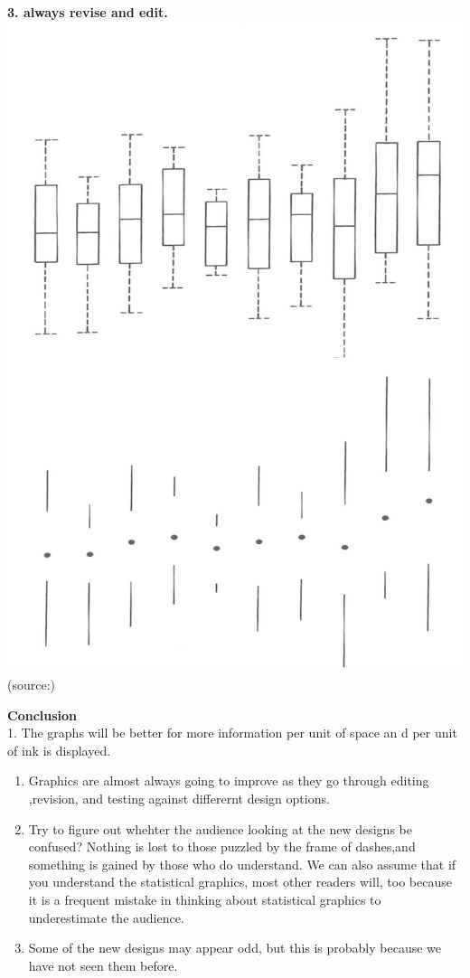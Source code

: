 \documentclass[]{book}
\theoremstyle{definition}
\theoremstyle{definition}
\theoremstyle{definition}
\theoremstyle{remark}
\begin{document}
\textbf{3. always revise and edit.}\\
\includegraphics{images/Tufte_figure4.png} (source:\citep{Tufte_2001})

\textbf{Conclusion}\\
1. The graphs will be better for more information per unit of space an d
per unit of ink is displayed.

\begin{enumerate}
\def\labelenumi{\arabic{enumi}.}
\setcounter{enumi}{1}
\item
  Graphics are almost always going to improve as they go through editing
  ,revision, and testing against differernt design options.
\item
  Try to figure out whehter the audience looking at the new designs be
  confused? Nothing is lost to those puzzled by the frame of dashes,and
  something is gained by those who do understand. We can also assume
  that if you understand the statistical graphics, most other readers
  will, too because it is a frequent mistake in thinking about
  statistical graphics to underestimate the audience.
\item
  Some of the new designs may appear odd, but this is probably because
  we have not seen them before.
\end{enumerate}
\end{document}
